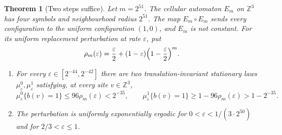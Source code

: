 \documentclass[11pt]{article}
\theoremstyle{plain}
\newtheorem{theorem}{Theorem}[section]
\theoremstyle{definition}
\theoremstyle{remark}
\newcommand{\Z}{\mathbb Z}
\newcommand{\eps}{\varepsilon}
\begin{document}
\begin{theorem}[Two steps suffice]\label{thm:two-step}
Let $m=2^{51}$. The cellular automaton $E_m$ on $\Z^3$ has four symbols and neighbourhood radius $2^{51}$. The map $E_m\circ E_m$ sends every configuration to the uniform configuration $(1,0)$, and $E_m$ is not constant. For its uniform replacement perturbation at rate $\eps$, put
\[
 \rho_m(\eps)=\frac\eps2+(1-\eps)\Bigl(1-\frac\eps2\Bigr)^m .
\]
\begin{enumerate}[label=\textup{(\roman*)}]
\item For every $\eps\in[2^{-44},2^{-42}]$ there are two translation-invariant stationary laws $\mu^0_\eps,\mu^1_\eps$ satisfying, at every site $v\in\Z^3$,
\[
 \mu^0_\eps\{b(v)=1\}\leq96\rho_m(\eps)<2^{-35},\qquad
 \mu^1_\eps\{b(v)=1\}\geq1-96\rho_m(\eps)>1-2^{-35}.
\]
\item The perturbation is uniformly exponentially ergodic for $0<\eps<1/(3\cdot2^{50})$ and for $2/3<\eps\leq1$.
\end{enumerate}
\end{theorem}
\end{document}
